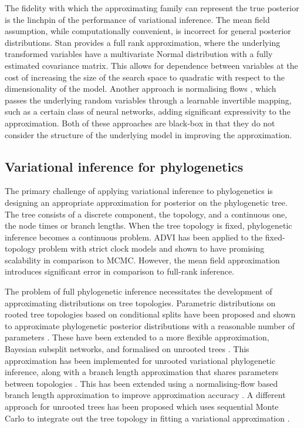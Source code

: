 The fidelity with which the approximating family can represent the true posterior is the linchpin of the performance of variational inference. The mean field assumption, while computationally convenient, is incorrect for general posterior distributions. Stan provides a full rank approximation, where the underlying transformed variables have a multivariate Normal distribution with a fully estimated covariance matrix. This allows for dependence between variables at the cost of increasing the size of the search space to quadratic with respect to the dimensionality of the model. Another approach is normalising flows \cite{rezende2015variational}, which passes the underlying random variables through a learnable invertible mapping, such as a certain class of neural networks, adding significant expressivity to the approximation. Both of these approaches are black-box in that they do not consider the structure of the underlying model in improving the approximation.

\subsection*{Variational inference for phylogenetics}

The primary challenge of applying variational inference to phylogenetics is designing an appropriate approximation for posterior on the phylogenetic tree. The tree consists of a discrete component, the topology, and a continuous one, the node times or branch lengths. When the tree topology is fixed, phylogenetic inference becomes a continuous problem. ADVI has been applied to the fixed-topology problem with strict clock models \cite{fourment2019evaluating, fourment202019} and shown to have promising scalability in comparison to MCMC. However, the mean field approximation introduces significant error in comparison to full-rank inference. 

The problem of full phylogenetic inference necessitates the development of approximating distributions on tree topologies. Parametric distributions on rooted tree topologies based on conditional splits have been proposed and shown to approximate phylogenetic posterior distributions with a reasonable number of parameters \cite{hohna2012guided, larget2013estimation}. These have been extended to a more flexible approximation, Bayesian subsplit networks, and formalised on unrooted trees \cite{zhang2018generalizing}. This approximation has been implemented for unrooted variational phylogenetic inference, along with a branch length approximation that shares parameters between topologies \cite{zhang2018variational}. This has been extended using a normalising-flow based branch length approximation to improve approximation accuracy \cite{zhang2020improved}. A different approach for unrooted trees has been proposed which uses sequential Monte Carlo to integrate out the tree topology in fitting a variational approximation \cite{moretti2020variational}.

